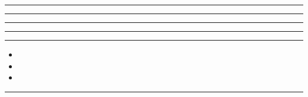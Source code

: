 \documentclass[11pt,a4paper]{article}
\begin{document}
\swarmwrapnext\lipsum[1]\lipsum[2]
\begin{swarmwrap}%
  \begin{minipage}[t]{4cm}
    \centering
    \textcolor{red!20}{\rule{\linewidth}{10cm}}
  \end{minipage}%
\end{swarmwrap}%
\swarmwrapnext\lipsum[1]\lipsum[2]\lipsum[3]
\begin{swarmwrap}%
  \begin{minipage}[t]{5cm}
    \centering
    \textcolor{red!20}{\rule{\linewidth}{2cm}}
  \end{minipage}%
\end{swarmwrap}%
\swarmwrapnext\lipsum[1]\lipsum[2]\lipsum[3]\lipsum[4]
\begin{swarmwrap}%
  \begin{minipage}[t]{2cm}
    \centering
    \textcolor{red!20}{\rule{\linewidth}{3cm}}
  \end{minipage}%
\end{swarmwrap}%
\swarmwrapnext\lipsum[1]\lipsum[2]\lipsum[3]\lipsum[4]\lipsum[5]
\begin{swarmwrap}%
  \begin{minipage}[t]{3cm}
    \centering
    \textcolor{red!20}{\rule{\linewidth}{4cm}}
  \end{minipage}%
\end{swarmwrap}%
\swarmwrapnext\lipsum[1]\lipsum[2]\lipsum[3]\lipsum[4]\lipsum[5]\lipsum[6]
\begin{swarmwrap}%
  \begin{minipage}[t]{4cm}
    \centering
    \textcolor{green!30}{\rule{\linewidth}{5cm}}
  \end{minipage}%
\end{swarmwrap}%
\swarmwrapnext
\begin{itemize}
  \item \lipsum[1][1-3]
  \item \lipsum[2][1-3]
  \item \lipsum[3][1-3]
\end{itemize}
\begin{swarmwrap}%
  \begin{minipage}[t]{5cm}
    \centering
    \textcolor{red!20}{\rule{\linewidth}{6cm}}
  \end{minipage}%
\end{swarmwrap}%
\end{document}
